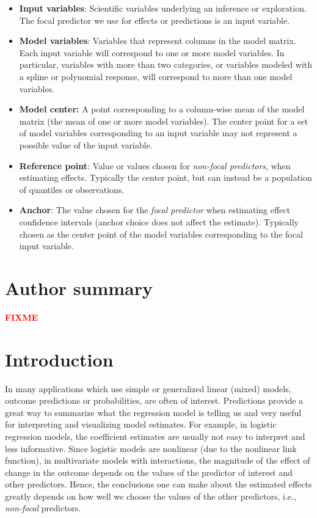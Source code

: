 \documentclass[10pt,letterpaper]{article}
\newcommand{\fix}{{\bf \textcolor{red}{FIXME}}}
\begin{document}
\begin{itemize}
\item \textbf{Input variables}: Scientific variables underlying an inference or exploration. The focal predictor we use for effects or predictions is an input variable.
\item \textbf{Model variables}: Variables that represent columns in the model matrix. Each input variable will correspond to one or more model variables. In particular, variables with more than two categories, or variables modeled with a spline or polynomial response, will correspond to more than one model variables.
\item\textbf{Model center:} A point corresponding to a column-wise mean of the model matrix (the mean of one or more model variables). The center point for a set of model variables corresponding to an input variable may not represent a possible value of the input variable.
\item \textbf{Reference point}: Value or values chosen for \emph{non-focal predictors}, when estimating effects. Typically the center point, but can instead be a population of quantiles or observations. 
\item \textbf{Anchor}: The value chosen for the \emph{focal predictor} when estimating effect confidence intervals (anchor choice does not affect the estimate). Typically chosen as the center point of the model variables corresponding to the focal input variable.
\end{itemize}

\section*{Author summary}

\fix

\linenumbers

\section*{Introduction}

In many applications which use simple or generalized linear (mixed) models, outcome predictions or probabilities, are often of interest. Predictions provide a great way to summarize what the regression model is telling us and very useful for interpreting and visualizing model estimates. For example, in logistic regression models, the coefficient estimates are usually not easy to interpret and less informative. Since logistic models are nonlinear (due to the nonlinear link function), in multivariate models with interactions, the magnitude of the effect of change in the outcome depends on the values of the predictor of interest and other predictors. Hence, the conclusions one can make about the estimated effects greatly depends on how well we choose the values of the other predictors, i.e., \emph{non-focal} predictors.  
\end{document}
